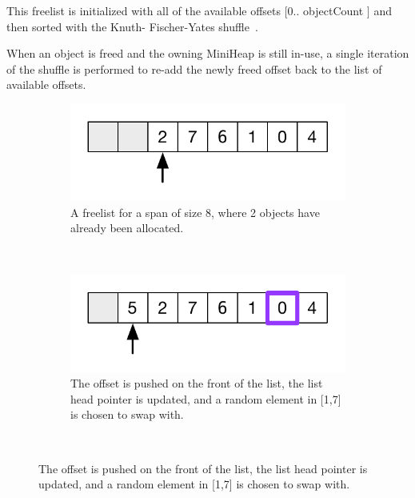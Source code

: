 This freelist is initialized with all of the available offsets $[0
  .. $ objectCount $]$ and then sorted with the Knuth-
Fischer-Yates shuffle~\cite{knuth:1981:semi}.

When an object is freed and the owning MiniHeap is still in-use, a
single iteration of the shuffle is performed to re-add the newly freed
offset back to the list of available offsets.

\begin{figure}[!t]
  \begin{subfigure}[t]{.4\textwidth}
    \centering
    \includegraphics[width=\textwidth]{figures/shuffle-freelist_a}
    \caption{A freelist for a span of size 8, where 2 objects have
      already been allocated.}
  \end{subfigure}%
  ~

  \begin{subfigure}[t]{.4\textwidth}
    \centering
    \includegraphics[width=\textwidth]{figures/shuffle-freelist_b}
    \caption{The offset is pushed on the front of the list, the list
      head pointer is updated, and a random element in [1,7] is chosen
      to swap with.}
  \end{subfigure}%
  ~


\end{figure}

